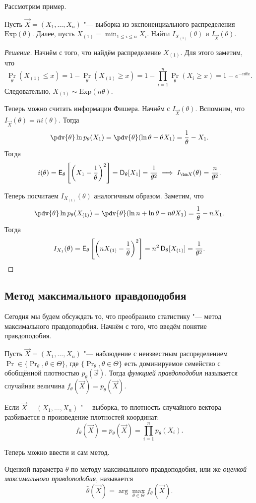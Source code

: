 Рассмотрим пример.
\begin{problem}
	Пусть $\vec{X} = (X_{1}, \ldots, X_{n})$ "--- выборка из экспоненциального распределения $\mathrm{Exp}(\theta)$. Далее, пусть $X_{(1)} = \min_{1 \leq i \leq n} X_{i}$. Найти $I_{X_{(1)}}(\theta)$ и $I_{\vec{X}}(\theta)$.
\end{problem}
\begin{proof}[Решение]
	Начнём с того, что найдём распределение $X_{(1)}$. Для этого заметим, что
	\[
		\Pr_{\theta}(X_{(1)} \leq x) = 1 - \Pr_{\theta}(X_{(1)} \geq x) = 1 - \prod_{i = 1}^{n} \Pr_{\theta}(X_{i} \geq x) = 1 - e^{-n\theta x}.
	\]
	Следовательно, $X_{(1)} \sim \mathrm{Exp}(n\theta)$. 
	
	Теперь можно считать информации Фишера. Начнём с $I_{\vec{X}}(\theta)$. Вспомним, что $I_{\vec{X}}(\theta) = ni(\theta)$. Тогда
	\[
		\pdv{\theta} \ln p_{\theta}(X_{1}) = \pdv{\theta}(\ln \theta - \theta X_{1}) = \frac{1}{\theta} - X_{1}.
	\]
	Тогда
	\[
		i(\theta) = \EE_{\theta}\left[\left(X_{1} - \frac{1}{\theta}\right)^{2}\right] = \DD_{\theta}[X_{1}] = \frac{1}{\theta^{2}} \implies I_{\vec{X}}(\theta) = \frac{n}{\theta^{2}}.
	\]
	
	Теперь посчитаем $I_{X_{(1)}}(\theta)$ аналогичным образом. Заметим, что
	\[
		\pdv{\theta} \ln p_{\theta}(X_{(1)}) = \pdv{\theta}(\ln n + \ln \theta - n\theta X_{1}) = \frac{1}{\theta} - nX_{1}.
	\]
	Тогда 
	\[
		I_{X_{1}}(\theta) = \EE_{\theta}\left[\left(nX_{(1)} - \frac{1}{\theta}\right)^{2}\right] = n^{2}\DD_{\theta}[X_{(1)}] = \frac{1}{\theta^{2}}. \qedhere
	\]
\end{proof}

\subsection{Метод максимального правдоподобия}

Сегодня мы будем обсуждать то, что преобразило статистику "--- метод максимального правдоподобия. Начнём с того, что введём понятие правдоподобия.
\begin{definition}
    Пусть $\vec{X} = (X_{1}, \ldots, X_{n})$ "--- наблюдение с неизвестным распределением $\Pr \in \{\Pr_{\theta}, \theta \in \Theta\}$, где $\{\Pr_{\theta}, \theta \in \Theta\}$ есть доминируемое семейство с обобщённой плотностью $p_{\theta}(\vec{x})$. Тогда \emph{функцией правдоподобия} называется случайная величина $f_{\theta}(\vec{X}) = p_{\theta}(\vec{X})$.
\end{definition}
\begin{remark}
    Если $\vec{X} = (X_{1}, \ldots, X_{n})$ "--- выборка, то плотность случайного вектора разбивается в произведение плотностей координат:
    \[
        f_{\theta}(\vec{X}) = p_{\theta}(\vec{X}) = \prod_{i = 1}^{n} p_{\theta}(X_{i}).
    \]
\end{remark}
Теперь можно ввести и сам метод.
\begin{definition}
    Оценкой параметра $\theta$ по методу максимального правдоподобия, или же \emph{оценкой максимального правдоподобия}, называется
    \[
        \hat{\theta}(\vec{X}) = \arg\max_{\theta \in \Theta} f_{\theta}(\vec{X}).
    \]
\end{definition}

